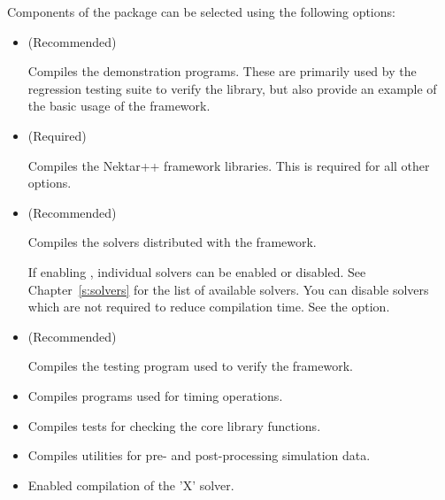 Components of the \nekpp package can be selected using the following options:
\begin{itemize}
    \item {} (Recommended)
    
    Compiles the demonstration programs. These are primarily used by the
    regression testing suite to verify the \nekpp library, but also provide an
    example of the basic usage of the framework.

    \item {} (Required)
    
    Compiles the Nektar++ framework libraries. This is required for all other
    options.

    \item {} (Recommended)
    
    Compiles the solvers distributed with the \nekpp framework.

    If enabling , individual solvers can be
    enabled or disabled. See Chapter~\ref{s:solvers} for the list of available
    solvers. You can disable solvers which are not required to reduce
    compilation time. See the  option.

    \item {} (Recommended)

    Compiles the testing program used to verify the \nekpp framework.

    \item {}

    Compiles programs used for timing \nekpp operations.

    \item {}

    Compiles tests for checking the core library functions.

    \item {}

    Compiles utilities for pre- and post-processing simulation data.
    
    \item {}
    
    Enabled compilation of the 'X' solver.
\end{itemize}

